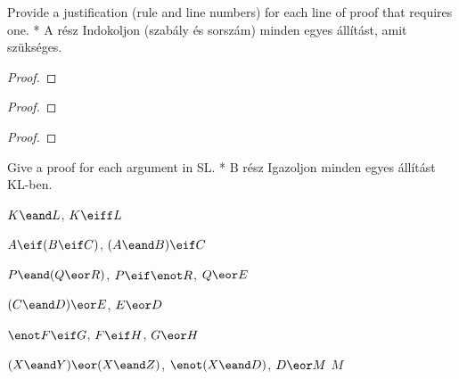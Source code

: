 

\practiceproblems

\solutions
\problempart
\label{pr.justifySLproof}
Provide a justification (rule and line numbers) for each line of proof that requires one.
* A rész Indokoljon (szabály és sorszám) minden egyes állítást, amit szükséges.
\begin{multicols}{2}
\begin{proof}
 {}
 {}
\end{proof}

\begin{proof}
\open
\close
{}
\end{proof}

\begin{proof}
\open
	 {}
	\open
	\close
\close
{}
\end{proof}
\end{multicols}

\solutions
\problempart
\label{pr.solvedSLproofs}
Give a proof for each argument in SL.
* B rész Igazoljon minden egyes állítást KL-ben.
\begin{earg}
\item $K\eand L$, \therefore $K\eiff L$
\item $A\eif (B\eif C)$, \therefore $(A\eand B)\eif C$
\item $P \eand (Q\eor R)$, $P\eif \enot R$, \therefore $Q\eor E$
\item $(C\eand D)\eor E$, \therefore $E\eor D$
\item $\enot F\eif G$, $F\eif H$, \therefore $G\eor H$
\item $(X\eand Y)\eor(X\eand Z)$, $\enot(X\eand D)$, $D\eor M$ \therefore $M$
\end{earg}

